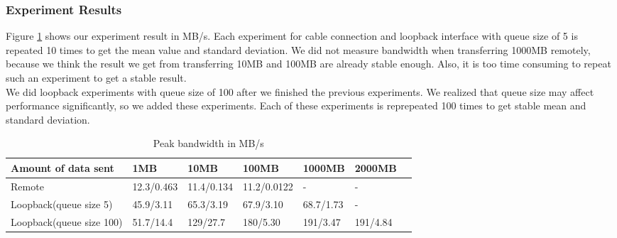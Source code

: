 \documentclass{article} %
\begin{document}
\subsubsection{Experiment Results}

Figure \ref{table:peak_bandwidth} shows our experiment result in MB/s. Each experiment for cable connection and loopback interface with queue size of 5 is repeated 10 times to get the mean value and standard deviation. We did not measure bandwidth when transferring 1000MB remotely, because we think the result we get from transferring 10MB and 100MB are already stable enough. Also, it is too time consuming to repeat such an experiment to get a stable result.\\
We did loopback experiments with queue size of 100 after we finished the previous experiments. We realized that queue size may affect performance significantly, so we added these experiments. Each of these experiments is reprepeated 100 times to get stable mean and standard deviation.\\

\begin{table}
  \begin{center}
    \caption{Peak bandwidth in MB/s}
    \begin{tabular}{|l|l|l|l|l|l|l|}
      \hline
      Amount of data sent      & 1MB        & 10MB       & 100MB       & 1000MB    & 2000MB   \\ \hline
      Remote                   & 12.3/0.463 & 11.4/0.134 & 11.2/0.0122 & -         & -        \\ \hline
      Loopback(queue size 5)   & 45.9/3.11  & 65.3/3.19  & 67.9/3.10   & 68.7/1.73 & -        \\ \hline
      Loopback(queue size 100) & 51.7/14.4  & 129/27.7   & 180/5.30    & 191/3.47  & 191/4.84 \\ \hline
    \end{tabular}
    \label{table:peak_bandwidth}
  \end{center}
\end{table}
\end{document}
